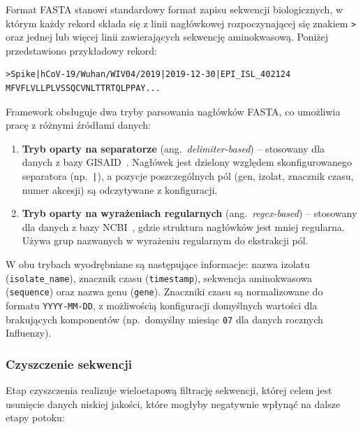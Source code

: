 Format FASTA stanowi standardowy format zapisu sekwencji biologicznych, w którym każdy rekord składa się z linii nagłówkowej rozpoczynającej się znakiem \texttt{>} oraz jednej lub więcej linii zawierających sekwencję aminokwasową. Poniżej przedstawiono przykładowy rekord:

\begin{lstlisting}[caption={Przyklad rekordu w formacie FASTA dla bialka S wirusa SARS-CoV-2.}, label={lst:fasta-example}, language={}]
>Spike|hCoV-19/Wuhan/WIV04/2019|2019-12-30|EPI_ISL_402124
MFVFLVLLPLVSSQCVNLTTRTQLPPAY...
\end{lstlisting}

Framework obsługuje dwa tryby parsowania nagłówków FASTA, co umożliwia pracę z różnymi źródłami danych:

\begin{enumerate}
    \item \textbf{Tryb oparty na separatorze} (ang.~\emph{delimiter-based}) -- stosowany dla danych z bazy GISAID~\cite{elbe2017gisaid}. Nagłówek jest dzielony względem skonfigurowanego separatora (np.~\texttt{|}), a pozycje poszczególnych pól (gen, izolat, znacznik czasu, numer akcesji) są odczytywane z konfiguracji.
    \item \textbf{Tryb oparty na wyrażeniach regularnych} (ang.~\emph{regex-based}) -- stosowany dla danych z bazy NCBI~\cite{bao2008ncbi}, gdzie struktura nagłówków jest mniej regularna. Używa grup nazwanych w wyrażeniu regularnym do ekstrakcji pól.
\end{enumerate}

W obu trybach wyodrębniane są następujące informacje: nazwa izolatu (\texttt{isolate\_name}), znacznik czasu (\texttt{timestamp}), sekwencja aminokwasowa (\texttt{sequence}) oraz nazwa genu (\texttt{gene}). Znaczniki czasu są normalizowane do formatu \texttt{YYYY-MM-DD}, z możliwością konfiguracji domyślnych wartości dla brakujących komponentów (np.~domyślny miesiąc \texttt{07} dla danych rocznych Influenzy).

\subsubsection{Czyszczenie sekwencji}
\label{subsubsec:czyszczenie}

Etap czyszczenia realizuje wieloetapową filtrację sekwencji, której celem jest usunięcie danych niskiej jakości, które mogłyby negatywnie wpłynąć na dalsze etapy potoku:

